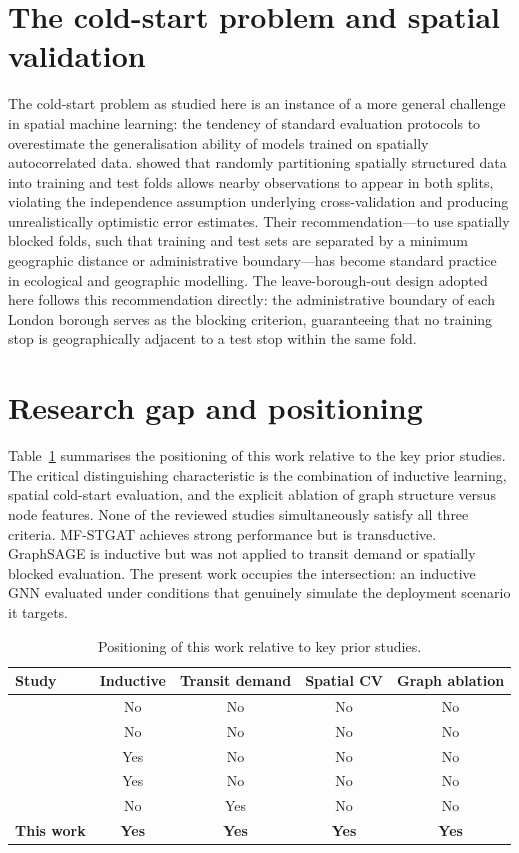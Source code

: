 \documentclass[12pt,a4paper]{report}
\begin{document}
\section{The cold-start problem and spatial validation}
The cold-start problem as studied here is an instance of a more general
challenge in spatial machine learning: the tendency of standard evaluation
protocols to overestimate the generalisation ability of models trained on
spatially autocorrelated data. \citet{roberts2017cross} showed that randomly
partitioning spatially structured data into training and test folds allows
nearby observations to appear in both splits, violating the independence
assumption underlying cross-validation and producing unrealistically
optimistic error estimates. Their recommendation---to use spatially blocked
folds, such that training and test sets are separated by a minimum geographic
distance or administrative boundary---has become standard practice in
ecological and geographic modelling. The leave-borough-out design adopted
here follows this recommendation directly: the administrative boundary of
each London borough serves as the blocking criterion, guaranteeing that no
training stop is geographically adjacent to a test stop within the same fold.

\section{Research gap and positioning}
Table~\ref{tab:litgap} summarises the positioning of this work relative to the
key prior studies. The critical distinguishing characteristic is the
combination of inductive learning, spatial cold-start evaluation, and the
explicit ablation of graph structure versus node features. None of the
reviewed studies simultaneously satisfy all three criteria. MF-STGAT achieves
strong performance but is transductive. GraphSAGE is inductive but was not
applied to transit demand or spatially blocked evaluation. The present work
occupies the intersection: an inductive GNN evaluated under conditions that
genuinely simulate the deployment scenario it targets.

\begin{table}[ht]
  \centering
  \caption{Positioning of this work relative to key prior studies.}
  \label{tab:litgap}
  \begin{tabular}{lcccc}
    \toprule
    Study & Inductive & Transit demand & Spatial CV & Graph ablation \\
    \midrule
    \citet{kipf2017semi}          & No  & No  & No  & No  \\
    \citet{velickovic2018graph}   & No  & No  & No  & No  \\
    \citet{hamilton2017inductive} & Yes & No  & No  & No  \\
    \citet{brody2022how}          & Yes & No  & No  & No  \\
    \citet{zheng2025mfstgat}      & No  & Yes & No  & No  \\
    \textbf{This work}            & \textbf{Yes} & \textbf{Yes} & \textbf{Yes} & \textbf{Yes} \\
    \bottomrule
  \end{tabular}
\end{table}
\end{document}
